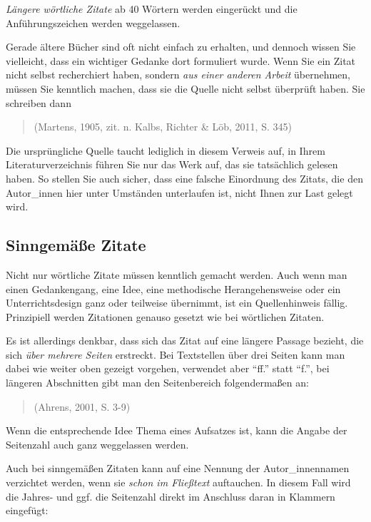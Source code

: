 \documentclass[ngerman,oneside,12pt,a4paper]{scrbook}
\begin{document}
\emph{Längere wörtliche Zitate} ab 40 Wörtern werden eingerückt und die
Anführungszeichen werden weggelassen.

Gerade ältere Bücher sind oft nicht einfach zu erhalten, und dennoch
wissen Sie vielleicht, dass ein wichtiger Gedanke dort formuliert wurde.
Wenn Sie ein Zitat nicht selbst recherchiert haben, sondern \emph{aus
einer anderen Arbeit} übernehmen, müssen Sie kenntlich machen, dass sie
die Quelle nicht selbst überprüft haben. Sie schreiben dann

\begin{quote}
(Martens, 1905, zit. n. Kalbs, Richter \& Löb, 2011, S. 345)
\end{quote}

Die ursprüngliche Quelle taucht lediglich in diesem Verweis auf, in
Ihrem Literaturverzeichnis führen Sie nur das Werk auf, das sie
tatsächlich gelesen haben. So stellen Sie auch sicher, dass eine falsche
Einordnung des Zitats, die den Autor\_innen hier unter Umständen
unterlaufen ist, nicht Ihnen zur Last gelegt wird.

\subsection{Sinngemäße Zitate}\label{sinngemae-zitate}

Nicht nur wörtliche Zitate müssen kenntlich gemacht werden. Auch wenn
man einen Gedankengang, eine Idee, eine methodische Herangehensweise
oder ein Unterrichtsdesign ganz oder teilweise übernimmt, ist ein
Quellenhinweis fällig. Prinzipiell werden Zitationen genauso gesetzt wie
bei wörtlichen Zitaten.

Es ist allerdings denkbar, dass sich das Zitat auf eine längere Passage
bezieht, die sich \emph{über mehrere Seiten} erstreckt. Bei Textstellen
über drei Seiten kann man dabei wie weiter oben gezeigt vorgehen,
verwendet aber \enquote{ff.} statt \enquote{f.}, bei längeren
Abschnitten gibt man den Seitenbereich folgendermaßen an:

\begin{quote}
(Ahrens, 2001, S. 3-9)
\end{quote}

Wenn die entsprechende Idee Thema eines Aufsatzes ist, kann die Angabe
der Seitenzahl auch ganz weggelassen werden.

Auch bei sinngemäßen Zitaten kann auf eine Nennung der Autor\_innennamen
verzichtet werden, wenn sie \emph{schon im Fließtext} auftauchen. In
diesem Fall wird die Jahres- und ggf. die Seitenzahl direkt im Anschluss
daran in Klammern eingefügt:
\end{document}
